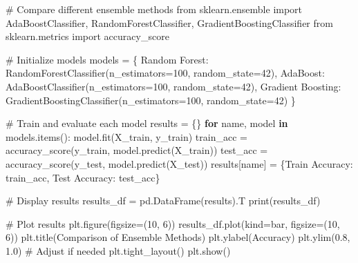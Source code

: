 \documentclass[
  letterpaper,
  DIV=11,
  numbers=noendperiod]{scrreprt}
\newenvironment{Shaded}{\begin{snugshade}}{\end{snugshade}}
\newcommand{\BuiltInTok}[1]{\textcolor[rgb]{0.00,0.23,0.31}{#1}}
\newcommand{\CommentTok}[1]{\textcolor[rgb]{0.37,0.37,0.37}{#1}}
\newcommand{\ControlFlowTok}[1]{\textcolor[rgb]{0.00,0.23,0.31}{\textbf{#1}}}
\newcommand{\DecValTok}[1]{\textcolor[rgb]{0.68,0.00,0.00}{#1}}
\newcommand{\FloatTok}[1]{\textcolor[rgb]{0.68,0.00,0.00}{#1}}
\newcommand{\ImportTok}[1]{\textcolor[rgb]{0.00,0.46,0.62}{#1}}
\newcommand{\KeywordTok}[1]{\textcolor[rgb]{0.00,0.23,0.31}{\textbf{#1}}}
\newcommand{\NormalTok}[1]{\textcolor[rgb]{0.00,0.23,0.31}{#1}}
\newcommand{\OperatorTok}[1]{\textcolor[rgb]{0.37,0.37,0.37}{#1}}
\newcommand{\StringTok}[1]{\textcolor[rgb]{0.13,0.47,0.30}{#1}}
\begin{document}
\begin{Shaded}
\begin{Highlighting}[]
\CommentTok{\# Compare different ensemble methods}
\ImportTok{from}\NormalTok{ sklearn.ensemble }\ImportTok{import}\NormalTok{ AdaBoostClassifier, RandomForestClassifier, GradientBoostingClassifier}
\ImportTok{from}\NormalTok{ sklearn.metrics }\ImportTok{import}\NormalTok{ accuracy\_score}

\CommentTok{\# Initialize models}
\NormalTok{models }\OperatorTok{=}\NormalTok{ \{}
    \StringTok{\textquotesingle{}Random Forest\textquotesingle{}}\NormalTok{: RandomForestClassifier(n\_estimators}\OperatorTok{=}\DecValTok{100}\NormalTok{, random\_state}\OperatorTok{=}\DecValTok{42}\NormalTok{),}
    \StringTok{\textquotesingle{}AdaBoost\textquotesingle{}}\NormalTok{: AdaBoostClassifier(n\_estimators}\OperatorTok{=}\DecValTok{100}\NormalTok{, random\_state}\OperatorTok{=}\DecValTok{42}\NormalTok{),}
    \StringTok{\textquotesingle{}Gradient Boosting\textquotesingle{}}\NormalTok{: GradientBoostingClassifier(n\_estimators}\OperatorTok{=}\DecValTok{100}\NormalTok{, random\_state}\OperatorTok{=}\DecValTok{42}\NormalTok{)}
\NormalTok{\}}

\CommentTok{\# Train and evaluate each model}
\NormalTok{results }\OperatorTok{=}\NormalTok{ \{\}}
\ControlFlowTok{for}\NormalTok{ name, model }\KeywordTok{in}\NormalTok{ models.items():}
\NormalTok{    model.fit(X\_train, y\_train)}
\NormalTok{    train\_acc }\OperatorTok{=}\NormalTok{ accuracy\_score(y\_train, model.predict(X\_train))}
\NormalTok{    test\_acc }\OperatorTok{=}\NormalTok{ accuracy\_score(y\_test, model.predict(X\_test))}
\NormalTok{    results[name] }\OperatorTok{=}\NormalTok{ \{}\StringTok{\textquotesingle{}Train Accuracy\textquotesingle{}}\NormalTok{: train\_acc, }\StringTok{\textquotesingle{}Test Accuracy\textquotesingle{}}\NormalTok{: test\_acc\}}

\CommentTok{\# Display results}
\NormalTok{results\_df }\OperatorTok{=}\NormalTok{ pd.DataFrame(results).T}
\BuiltInTok{print}\NormalTok{(results\_df)}

\CommentTok{\# Plot results}
\NormalTok{plt.figure(figsize}\OperatorTok{=}\NormalTok{(}\DecValTok{10}\NormalTok{, }\DecValTok{6}\NormalTok{))}
\NormalTok{results\_df.plot(kind}\OperatorTok{=}\StringTok{\textquotesingle{}bar\textquotesingle{}}\NormalTok{, figsize}\OperatorTok{=}\NormalTok{(}\DecValTok{10}\NormalTok{, }\DecValTok{6}\NormalTok{))}
\NormalTok{plt.title(}\StringTok{\textquotesingle{}Comparison of Ensemble Methods\textquotesingle{}}\NormalTok{)}
\NormalTok{plt.ylabel(}\StringTok{\textquotesingle{}Accuracy\textquotesingle{}}\NormalTok{)}
\NormalTok{plt.ylim(}\FloatTok{0.8}\NormalTok{, }\FloatTok{1.0}\NormalTok{)  }\CommentTok{\# Adjust if needed}
\NormalTok{plt.tight\_layout()}
\NormalTok{plt.show()}
\end{Highlighting}
\end{Shaded}
\end{document}
